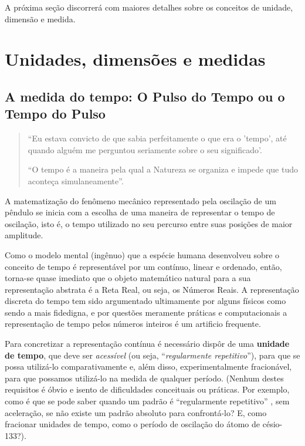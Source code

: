     A próxima seção discorrerá com maiores detalhes sobre os conceitos de unidade, dimensão e medida.


\section{Unidades, dimensões e medidas}

\subsection{A medida do tempo: O Pulso do Tempo ou o Tempo do Pulso}

\begin{quote}
``Eu estava convicto de que sabia perfeitamente o que era o ’tempo’, até quando alguém me perguntou seriamente sobre o seu significado'.


``O tempo é a maneira pela qual a Natureza se organiza e impede que tudo aconteça simulaneamente''.

\end{quote}

A matematização do fenômeno mecânico representado pela oscilação de um pêndulo se inicia com a escolha de uma maneira de representar o tempo de oscilação, isto é, o tempo utilizado no seu percurso entre suas posições de maior amplitude.

Como o modelo mental (ingênuo) que a espécie humana desenvolveu sobre o conceito de tempo é representável por um contínuo, linear e ordenado, então, torna-se quase imediato que o objeto matemático natural para a sua representação abstrata é a Reta Real, ou seja, os Números Reais. A representação discreta do tempo tem sido argumentado ultimamente por alguns físicos como sendo a mais fidedigna, e por questões meramente práticas e computacionais a representação de tempo pelos números inteiros é um artificio frequente.

Para concretizar a representação contínua é necessário dispôr de uma \textbf{unidade de tempo}, que deve ser \textit{acessível} (ou seja, ``\textit{regularmente repetitivo}''), para que se possa utilizá-lo comparativamente e, além disso, experimentalmente fracionável, para que possamos utilizá-lo na medida de qualquer período. (Nenhum destes requisitos é óbvio e isento de dificuldades conceituais ou práticas. Por exemplo, como é que se pode saber quando um padrão é ``regularmente repetitivo'' , sem aceleração, se não existe um padrão absoluto para confrontá-lo? E, como fracionar unidades de tempo, como o período de oscilação do átomo de césio-133?).

